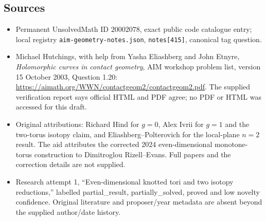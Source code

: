 \documentclass[11pt]{article}
\begin{document}
\subsection{Sources}
\begin{itemize}
\item Permanent UnsolvedMath ID \(20002078\), exact public code catalogue entry; local registry \texttt{aim-geometry-notes.json}, \texttt{notes[415]}, canonical tag question.
\item Michael Hutchings, with help from Yasha Eliashberg and John Etnyre, \emph{Holomorphic curves in contact geometry}, AIM workshop problem list, version 15 October 2003, Question 1.20: \url{https://aimath.org/WWN/contactgeom2/contactgeom2.pdf}. The supplied verification report says official HTML and PDF agree; no PDF or HTML was accessed for this draft.
\item Original attributions: Richard Hind for \(g=0\), Alex Ivrii for \(g=1\) and the two-torus isotopy claim, and Eliashberg--Polterovich for the local-plane \(n=2\) result. The aid attributes the corrected 2024 even-dimensional monotone-torus construction to Dimitroglou Rizell--Evans. Full papers and the correction details are not supplied.
\item Research attempt 1, ``Even-dimensional knotted tori and two isotopy reductions,'' labelled partial\_result, partially\_solved, proved and low novelty confidence. Original literature and proposer/year metadata are absent beyond the supplied author/date history.
\end{itemize}
\end{document}

